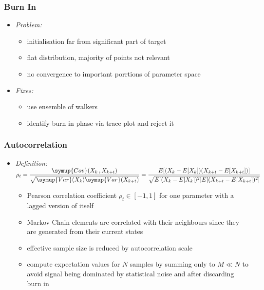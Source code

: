 	\begin{frame}
		\frametitle{Burn In}
		\begin{itemize}
			\item<2-> \itshape{Problem:}
			\begin{itemize}
				\item<3-> initialisation far from significant part of target
				\item<4-> flat distribution, majority of points not relevant
				\item<5-> no convergence to important porrtions of parameter space
			\end{itemize}
			\item<6-> \itshape{Fixes:}
			\begin{itemize}
				\item<7-> use ensemble of walkers
				\item<8-> identify burn in phase via trace plot and reject it
			\end{itemize}
		\end{itemize}
	\end{frame}

	\begin{frame}
		\frametitle{Autocorrelation}
		\begin{itemize}
			\item<2-> \itshape{Definition:} $\displaystyle{\rho_t = \frac{\symup{Cov}(X_k \, , X_{k+t})}{\sqrt{\symup{Var}(X_k)\symup{Var}(X_{k+t})}} =
											 \frac{E[(X_k - E[X_k])(X_{k+t} - E[X_{k+t}])]}{\sqrt{E[(X_k - E[X_k])^2]E[(X_{k+t} - E[X_{k+t}])^2]}}}$
											 \vspace{1.5ex}
			\begin{itemize}
				\item<3-> Pearson correlation coefficient $\rho_t \in [-1, 1]$ for one parameter with a lagged version of itself
				\item<4-> Markov Chain elements are correlated with their neighbours since they are generated from their current states
				\item<5-> effective sample size is reduced by autocorrelation scale
				\item<6-> compute expectation values for $N$ samples by summing only to $M \ll N$ to avoid signal being dominated by statistical
						  noise and after discarding burn in
			\end{itemize}
		\end{itemize}
	\end{frame}

